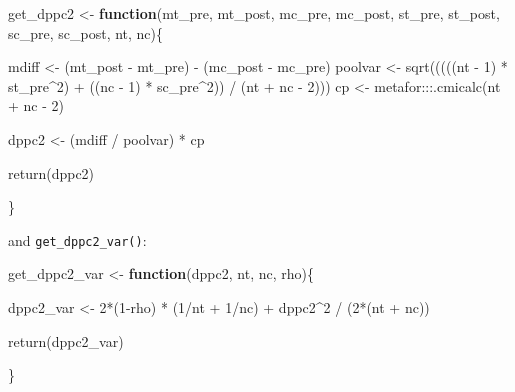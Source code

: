 \documentclass[
]{article}
\newenvironment{Shaded}{\begin{snugshade}}{\end{snugshade}}
\newcommand{\ControlFlowTok}[1]{\textcolor[rgb]{0.13,0.29,0.53}{\textbf{#1}}}
\newcommand{\DecValTok}[1]{\textcolor[rgb]{0.00,0.00,0.81}{#1}}
\newcommand{\FunctionTok}[1]{\textcolor[rgb]{0.00,0.00,0.00}{#1}}
\newcommand{\NormalTok}[1]{#1}
\newcommand{\OtherTok}[1]{\textcolor[rgb]{0.56,0.35,0.01}{#1}}
\newcommand{\SpecialCharTok}[1]{\textcolor[rgb]{0.00,0.00,0.00}{#1}}
\begin{document}
\begin{Shaded}
\begin{Highlighting}[]
\NormalTok{get\_dppc2 }\OtherTok{\textless{}{-}} \ControlFlowTok{function}\NormalTok{(mt\_pre, mt\_post, mc\_pre, mc\_post,}
\NormalTok{                      st\_pre, st\_post, sc\_pre, sc\_post,}
\NormalTok{                      nt, nc)\{}
    
\NormalTok{    mdiff }\OtherTok{\textless{}{-}}\NormalTok{ (mt\_post }\SpecialCharTok{{-}}\NormalTok{ mt\_pre) }\SpecialCharTok{{-}}\NormalTok{ (mc\_post }\SpecialCharTok{{-}}\NormalTok{ mc\_pre)}
\NormalTok{    poolvar }\OtherTok{\textless{}{-}} \FunctionTok{sqrt}\NormalTok{(((((nt }\SpecialCharTok{{-}} \DecValTok{1}\NormalTok{) }\SpecialCharTok{*}\NormalTok{ st\_pre}\SpecialCharTok{\^{}}\DecValTok{2}\NormalTok{) }\SpecialCharTok{+}\NormalTok{ ((nc }\SpecialCharTok{{-}} \DecValTok{1}\NormalTok{) }\SpecialCharTok{*}\NormalTok{ sc\_pre}\SpecialCharTok{\^{}}\DecValTok{2}\NormalTok{)) }\SpecialCharTok{/}\NormalTok{ (nt }\SpecialCharTok{+}\NormalTok{ nc }\SpecialCharTok{{-}} \DecValTok{2}\NormalTok{)))}
\NormalTok{    cp }\OtherTok{\textless{}{-}}\NormalTok{ metafor}\SpecialCharTok{:::}\FunctionTok{.cmicalc}\NormalTok{(nt }\SpecialCharTok{+}\NormalTok{ nc }\SpecialCharTok{{-}} \DecValTok{2}\NormalTok{)}
    
\NormalTok{    dppc2 }\OtherTok{\textless{}{-}}\NormalTok{ (mdiff }\SpecialCharTok{/}\NormalTok{ poolvar) }\SpecialCharTok{*}\NormalTok{ cp}
    
    \FunctionTok{return}\NormalTok{(dppc2)}
    
\NormalTok{\}}
\end{Highlighting}
\end{Shaded}

and \texttt{get\_dppc2\_var()}:

\begin{Shaded}
\begin{Highlighting}[]
\NormalTok{get\_dppc2\_var }\OtherTok{\textless{}{-}} \ControlFlowTok{function}\NormalTok{(dppc2, nt, nc, rho)\{}
    
\NormalTok{    dppc2\_var }\OtherTok{\textless{}{-}} \DecValTok{2}\SpecialCharTok{*}\NormalTok{(}\DecValTok{1}\SpecialCharTok{{-}}\NormalTok{rho) }\SpecialCharTok{*}\NormalTok{ (}\DecValTok{1}\SpecialCharTok{/}\NormalTok{nt }\SpecialCharTok{+} \DecValTok{1}\SpecialCharTok{/}\NormalTok{nc) }\SpecialCharTok{+}\NormalTok{ dppc2}\SpecialCharTok{\^{}}\DecValTok{2} \SpecialCharTok{/}\NormalTok{ (}\DecValTok{2}\SpecialCharTok{*}\NormalTok{(nt }\SpecialCharTok{+}\NormalTok{ nc))}
    
    \FunctionTok{return}\NormalTok{(dppc2\_var)}
    
\NormalTok{\}}
\end{Highlighting}
\end{Shaded}
\end{document}
